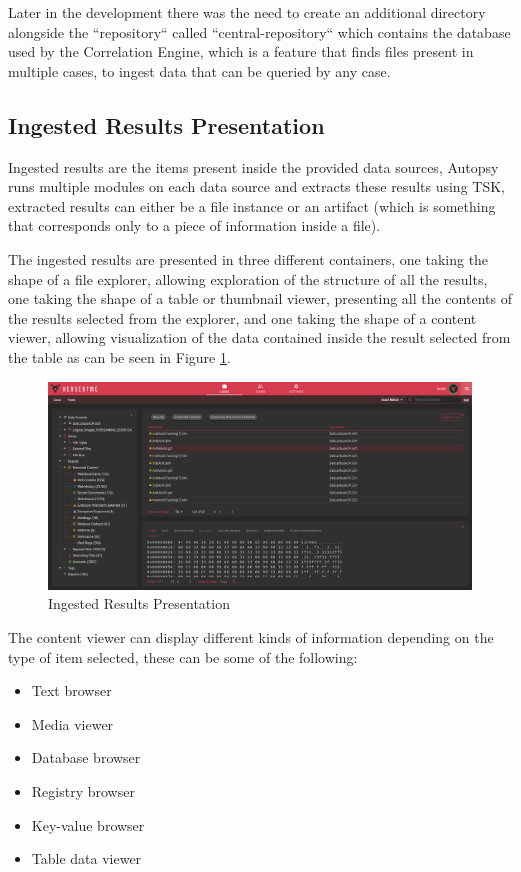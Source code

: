 Later in the development there was the need to create an additional directory alongside the ``repository`` called ``central-repository``
which contains the database used by the Correlation Engine, which is a feature that finds files present in multiple cases, to ingest data that can be queried by any case.

\subsection{Ingested Results Presentation}

Ingested results are the items present inside the provided data sources, Autopsy runs multiple modules on each data source and extracts these results using TSK,
extracted results can either be a file instance or an artifact (which is something that corresponds only to a piece of information inside a file).

The ingested results are presented in three different containers, one taking the shape of a file explorer, allowing exploration of the structure of all the results, 
one taking the shape of a table or thumbnail viewer, presenting all the contents of the results selected from the explorer, and one taking the shape of a content viewer, allowing visualization
of the data contained inside the result selected from the table as can be seen in Figure \ref{fig:data}.

\begin{figure}[ht]
 \centering
 \includegraphics[width=1\linewidth]{imgs/data.png}
 \caption{Ingested Results Presentation}
 \label{fig:data}
\end{figure}

The content viewer can display different kinds of information depending on the type of item selected, these can be some of the following:
\begin{itemize}
 \item Text browser
 \item Media viewer
 \item Database browser
 \item Registry browser
 \item Key-value browser
 \item Table data viewer
\end{itemize}

